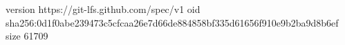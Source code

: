 version https://git-lfs.github.com/spec/v1
oid sha256:0d1f0abe239473c5cfcaa26e7d66de884858bf335d61656f910e9b2ba9d8b6ef
size 61709
